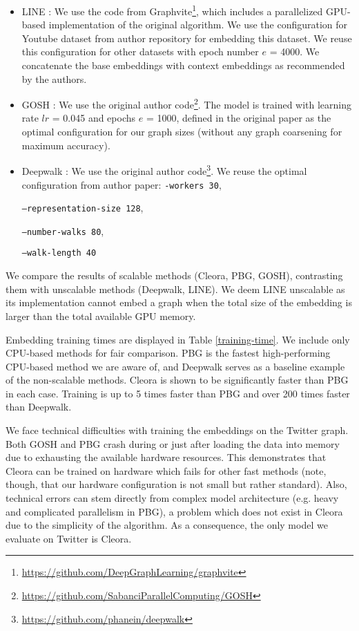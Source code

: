 \documentclass{IEEEtran}
\begin{document}
\begin{itemize}
    \item LINE \cite{tang2015line}: We use the code from Graphvite\footnote{\url{https://github.com/DeepGraphLearning/graphvite}}, which includes a parallelized GPU-based implementation of the original algorithm. We use the configuration for Youtube dataset from author repository for embedding this dataset. We reuse this configuration for other datasets with epoch number $e$ = 4000. We concatenate the base embeddings with context embeddings as recommended by the authors.
    \item GOSH \cite{10.1145/3404397.3404456}: We use the original author code\footnote{\url{https://github.com/SabanciParallelComputing/GOSH}}. The model is trained with learning rate $lr$ = 0.045 and epochs $e$ = 1000, defined in the original paper as the optimal configuration for our graph sizes (without any graph coarsening for maximum accuracy). 
\item Deepwalk \cite{perozzi2014deepwalk}: We use the original author code\footnote{\url{https://github.com/phanein/deepwalk}}. We reuse the optimal configuration from author paper: 
    \texttt{-workers 30},
    
    \texttt{--representation-size 128},
    
    \texttt{--number-walks 80},
    
    \texttt{--walk-length 40}

\end{itemize}

We compare the results of scalable methods (Cleora, PBG, GOSH), contrasting them with unscalable methods (Deepwalk, LINE). We deem LINE unscalable as its implementation cannot embed a graph when the total size of the embedding is larger than the total available GPU memory.

Embedding training times are displayed in Table \ref{training-time}. We include only CPU-based methods for fair comparison. PBG is the fastest high-performing CPU-based method we are aware of, and Deepwalk serves as a baseline example of the non-scalable methods. Cleora is shown to be significantly faster than PBG in each case. Training is up to 5 times faster than PBG and over 200 times faster than Deepwalk.

We face technical difficulties with training the embeddings on the Twitter graph. Both GOSH and PBG crash during or just after  loading the data into memory due to exhausting the available hardware resources.
This demonstrates that Cleora can be trained on hardware which fails for other fast methods (note, though, that our hardware configuration is not small but rather standard). Also, technical errors can stem directly from complex model architecture (e.g. heavy and complicated parallelism in PBG), a problem which does not exist in Cleora due to the simplicity of the algorithm. As a consequence, the only model we evaluate on Twitter is Cleora. 
\end{document}
